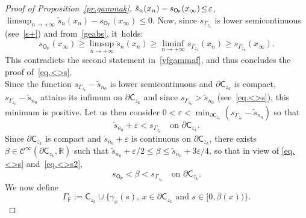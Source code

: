 \documentclass[JEP,XML,SOM,Unicode,NoEqCountersInSection,NoFloatCountersInSection,published]{cedram}
\let\pa\partial
\let\ve\varepsilon
\theoremstyle{plain}
\theoremstyle{definition}
\begin{document}
\begin{proof}[Proof of Proposition~\ref{pr.gammak}]
\hbox{$ \tilde s_{n}(x_n)-\nobreak s_{\mathsf O_{\mathsf F}}(x_{\infty})\!\le\! \ve$}, \ie $\limsup_{n\to +\infty} \tilde s_{n}(x_n)- s_{\mathsf O_{\mathsf F}}(x_{\infty})\le 0$. Now, since $s_{\Gamma_{z_k}}$ is lower semicontinuous (see~\eqref{s+}) and from~\eqref{geabs}, it~holds:
\[
s_{\mathsf O_{\mathsf F}}(x_{\infty})\ge \limsup_{n\to +\infty} \tilde s_{n}(x_n) \ge \liminf_{n\to +\infty} s_{\Gamma_{z_k}}(x_n)\ge s_{\Gamma_{z_k}}(x_\infty).
\]
This contradicts the second statement in~\eqref{vfgammaf}, and thus concludes the proof of~\eqref{eq.<>s}. \\
Since the function $s_{\Gamma_{z_k}}-\tilde s_{n_0}$ is lower semicontinuous and $\pa \mathsf C_{z_k}$ is compact, $s_{\Gamma_{z_k}}-\tilde s_{n_0}$ attains its infimum on $\pa \mathsf C_{z_k}$ and since $ s_{\Gamma_{z_k}}>\tilde s_{n_0}$ (see~\eqref{eq.<>s}), this minimum is positive. Let us then consider $0<\ve<\min_{\pa \mathsf C_{z_k}} (s_{\Gamma_{z_k}}-\tilde s_{n_0})$ so that
\begin{equation}\label{eq.<>s2}
\tilde s_{n_0} +\ve < s_{\Gamma_{z_k}} \quad \text{on } \pa \mathsf C_{z_k}.
\end{equation}
Since
$ \pa \mathsf C_{z_k}$ is compact and $ \tilde s_{n_0} +\ve$ is continuous on $ \pa \mathsf C_{z_k}$, there exists $\beta \in \mathcal C^\infty(\pa \mathsf C_{z_k},\mathbb R)$ such that $ \tilde s_{n_0} +\ve /2\le \beta \le \tilde s_{n_0} + {3\ve}/{4}$, so that in view of \eqref{eq.<>s} and~\eqref{eq.<>s2},
\begin{equation}\label{eq.betas}
s_{\mathsf O_{\mathsf F}} < \beta <s_{\Gamma_{z_k}} \quad \text{on } \pa \mathsf C_{z_k}.
\end{equation}
We now define
\begin{equation}\label{F}
\Gamma_{\mathsf F}:= \mathsf C_{z_k} \cup \big \{ \gamma_x(s), \, x\in \pa \mathsf C_{z_k} \text{ and } s\in [0,\beta(x))\big \}.
\end{equation}


\end{proof}
\end{document}

